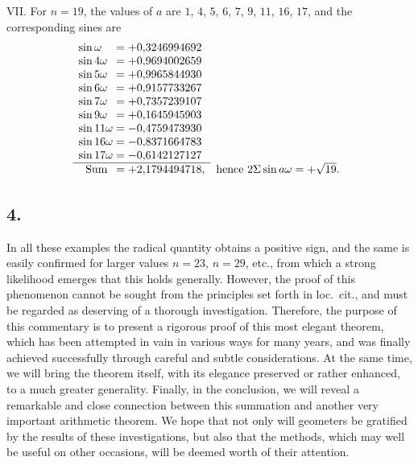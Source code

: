\documentclass[twoside,12pt]{memoir}
\begin{document}
VII. For \(n=19\), the values of \(a\) are \(1\), \(4\), \(5\), \(6\), \(7\), \(9\), \(11\), \(16\), \(17\), and the corresponding sines are
\[\begin{array}{rl}
 \sin \omega\phantom{11}=+0{,}3246994692 \phantom{,}&\\
 \sin 4 \omega\phantom{1}=+0{,}9694002659 \phantom{,}&\\
 \sin 5 \omega\phantom{1}=+0{,}9965844930 \phantom{,}&\\
\sin 6 \omega\phantom{1}=+0{,}9157733267 \phantom{,}&\\
 \sin 7 \omega\phantom{1}=+0{,}7357239107 \phantom{,}&\\
 \sin 9 \omega\phantom{1}=+0{,}1645945903 \phantom{,}&\\
 \sin 11 \omega=-0{,}4759473930 \phantom{,}&\\
 \sin 16 \omega=-0{,}8371664783 \phantom{,}&\\
 \sin 17 \omega=-0{,}6142127127 \phantom{,}&\\ 
 \cline{1-1} \text{Sum\phantom{a}}=+2{,}1794494718,&\text{hence } 2 \Sigma \sin a \omega=+\sqrt{19}.
\end{array}\]
%

\subsection*{4.}

In all these examples the radical quantity obtains a positive sign, and the same is easily confirmed for larger values \(n=23\), \(n=29\), etc{.}, from which a strong likelihood emerges that this holds generally. However, the proof of this phenomenon cannot be sought from the principles set forth in {loc.\ cit.}, and must be regarded as deserving of a thorough investigation. Therefore, the purpose of this commentary is to present a rigorous proof of this most elegant theorem, which has been attempted in vain in various ways for many years, and was finally achieved successfully through careful and subtle considerations. At the same time, we will bring the theorem itself, with its elegance preserved or rather enhanced, to a much greater generality. Finally, in the conclusion, we will reveal a remarkable and close connection between this summation and another very important arithmetic theorem. We hope that not only will geometers be gratified by the results of these investigations, but also that the methods, which may well be useful on other occasions, will be deemed worth of their attention.
%
\end{document}
